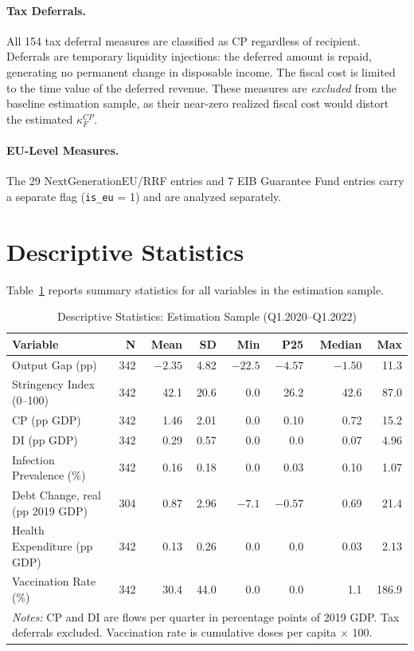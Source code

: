 \documentclass[12pt, a4paper]{article}
\begin{document}
\paragraph{Tax Deferrals.} All 154 tax deferral measures are classified as CP regardless of recipient. Deferrals are temporary liquidity injections: the deferred amount is repaid, generating no permanent change in disposable income. The fiscal cost is limited to the time value of the deferred revenue. These measures are \textit{excluded} from the baseline estimation sample, as their near-zero realized fiscal cost would distort the estimated $\kappa_F^{CP}$.

\paragraph{EU-Level Measures.} The 29 NextGenerationEU/RRF entries and 7 EIB Guarantee Fund entries carry a separate flag (\texttt{is\_eu} = 1) and are analyzed separately.


\section{Descriptive Statistics}
\label{app:descriptives}

Table~\ref{tab:desc_full} reports summary statistics for all variables in the estimation sample.

\begin{table}[htbp]
\centering
\caption{Descriptive Statistics: Estimation Sample (Q1.2020--Q1.2022)}
\label{tab:desc_full}
\small
\begin{tabular}{lrrrrrrr}
\toprule
Variable & N & Mean & SD & Min & P25 & Median & Max \\
\midrule
Output Gap (pp) & 342 & $-2.35$ & 4.82 & $-22.5$ & $-4.57$ & $-1.50$ & 11.3 \\
Stringency Index (0--100) & 342 & 42.1 & 20.6 & 0.0 & 26.2 & 42.6 & 87.0 \\
CP (pp GDP) & 342 & 1.46 & 2.01 & 0.0 & 0.10 & 0.72 & 15.2 \\
DI (pp GDP) & 342 & 0.29 & 0.57 & 0.0 & 0.0 & 0.07 & 4.96 \\
Infection Prevalence (\%) & 342 & 0.16 & 0.18 & 0.0 & 0.03 & 0.10 & 1.07 \\
Debt Change, real (pp 2019 GDP) & 304 & 0.87 & 2.96 & $-7.1$ & $-0.57$ & 0.69 & 21.4 \\
Health Expenditure (pp GDP) & 342 & 0.13 & 0.26 & 0.0 & 0.0 & 0.03 & 2.13 \\
Vaccination Rate (\%) & 342 & 30.4 & 44.0 & 0.0 & 0.0 & 1.1 & 186.9 \\
\bottomrule
\multicolumn{8}{p{13cm}}{\footnotesize \textit{Notes:} CP and DI are flows per quarter in percentage points of 2019 GDP. Tax deferrals excluded. Vaccination rate is cumulative doses per capita $\times$ 100.} \\
\end{tabular}
\end{table}
\end{document}
